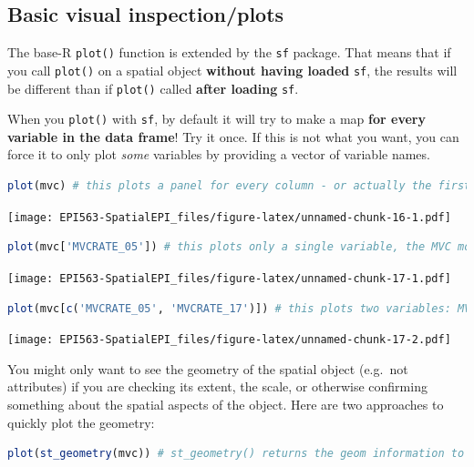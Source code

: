 \documentclass[
]{book}
\newcommand{\passthrough}[1]{#1}
\begin{document}
\hypertarget{basic-visual-inspectionplots}{%
\subsection{Basic visual inspection/plots}\label{basic-visual-inspectionplots}}

The base-R \passthrough{\lstinline!plot()!} function is extended by the \passthrough{\lstinline!sf!} package. That means that if you call \passthrough{\lstinline!plot()!} on a spatial object \textbf{without having loaded} \passthrough{\lstinline!sf!}, the results will be different than if \passthrough{\lstinline!plot()!} called \textbf{after loading} \passthrough{\lstinline!sf!}.

When you \passthrough{\lstinline!plot()!} with \passthrough{\lstinline!sf!}, by default it will try to make a map \textbf{for every variable in the data frame}! Try it once. If this is not what you want, you can force it to only plot \emph{some} variables by providing a vector of variable names.

\begin{lstlisting}[language=R]
plot(mvc) # this plots a panel for every column - or actually the first 10 columns
\end{lstlisting}

\texttt{[image: EPI563-SpatialEPI\_files/figure-latex/unnamed-chunk-16-1.pdf]}

\begin{lstlisting}[language=R]
plot(mvc['MVCRATE_05']) # this plots only a single variable, the MVC mortality rate for 2005
\end{lstlisting}

\texttt{[image: EPI563-SpatialEPI\_files/figure-latex/unnamed-chunk-17-1.pdf]}

\begin{lstlisting}[language=R]
plot(mvc[c('MVCRATE_05', 'MVCRATE_17')]) # this plots two variables: MVC rate in 2005 & 2017
\end{lstlisting}

\texttt{[image: EPI563-SpatialEPI\_files/figure-latex/unnamed-chunk-17-2.pdf]}

You might only want to see the geometry of the spatial object (e.g.~not attributes) if you are checking its extent, the scale, or otherwise confirming something about the spatial aspects of the object. Here are two approaches to quickly plot the geometry:

\begin{lstlisting}[language=R]
plot(st_geometry(mvc)) # st_geometry() returns the geom information to plot
\end{lstlisting}
\end{document}
